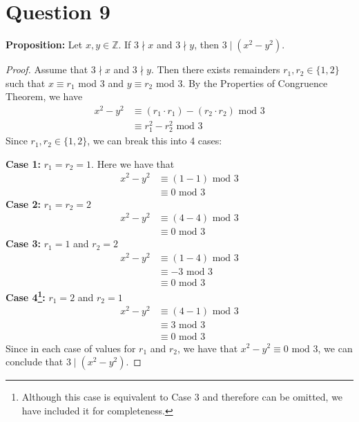 \documentclass[11pt, oneside]{article}   	%
\begin{document}
\section*{Question 9}

\textbf{Proposition:} Let $x,y \in \mathbb{Z}$. If $3 \nmid x$ and $3 \nmid y$, then $3 \mid (x^2 - y^2)$.

\begin{proof}
Assume that $3 \nmid x$ and $3 \nmid y$. Then there exists remainders $r_1, r_2 \in \{1,2\}$ such that $x \equiv r_1$ mod 3 and $y \equiv r_2$ mod 3. By the Properties of Congruence Theorem, we have
\begin{align*}
	x^2-y^2 & \equiv (r_1 \cdot r_1) - (r_2 \cdot r_2) \text{ mod } 3 \\
	& \equiv r_1^2 - r_2^2 \text{ mod } 3
\end{align*}
Since $r_1, r_2 \in \{1,2\}$, we can break this into 4 cases:

\textbf{Case 1:} $r_1=r_2=1$. Here we have that
\begin{align*}
	x^2-y^2 & \equiv (1-1) \text{ mod } 3 \\
	& \equiv 0 \text{ mod } 3
\end{align*}
\textbf{Case 2:} $r_1=r_2=2$
\begin{align*}
	x^2-y^2 & \equiv (4-4) \text{ mod } 3 \\
	& \equiv 0 \text{ mod } 3
\end{align*}
\textbf{Case 3:} $r_1=1$ and $r_2=2$
\begin{align*}
	x^2-y^2 & \equiv (1-4) \text{ mod } 3 \\
	& \equiv -3 \text{ mod } 3 \\
	& \equiv 0 \text{ mod } 3
\end{align*}
\textbf{Case 4\footnote{Although this case is equivalent to Case 3 and therefore can be omitted, we have included it for completeness.}:} $r_1=2$ and $r_2=1$
\begin{align*}
	x^2-y^2 & \equiv (4-1) \text{ mod } 3 \\
	& \equiv 3 \text{ mod } 3 \\
	& \equiv 0 \text{ mod } 3
\end{align*}
Since in each case of values for $r_1$ and $r_2$, we have that $x^2-y^2 \equiv 0 \text{ mod } 3 $, we can conclude that $3 \mid (x^2-y^2)$.
\end{proof}
\end{document}
